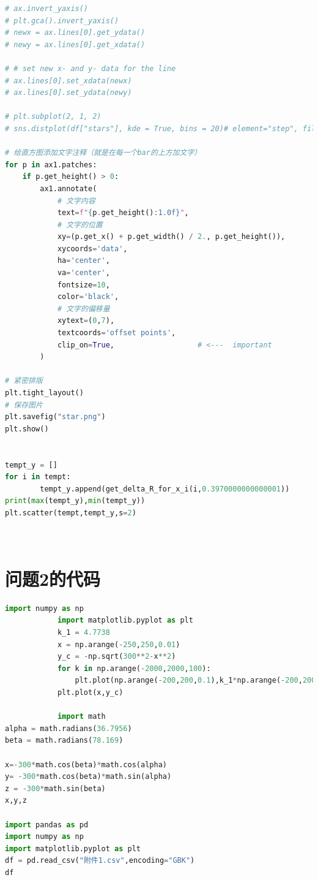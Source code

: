 \documentclass[withoutpreface,bwprint]{cumcmthesis} %
\begin{document}
\begin{appendices}
\begin{lstlisting}[language=python]
# ax.invert_yaxis() 
# plt.gca().invert_yaxis()
# newx = ax.lines[0].get_ydata()
# newy = ax.lines[0].get_xdata()

# # set new x- and y- data for the line
# ax.lines[0].set_xdata(newx)
# ax.lines[0].set_ydata(newy)

# plt.subplot(2, 1, 2)
# sns.distplot(df["stars"], kde = True, bins = 20)# element="step", fill=False)

# 给直方图添加文字注释（就是在每一个bar的上方加文字）
for p in ax1.patches:
    if p.get_height() > 0:
        ax1.annotate(
            # 文字内容
            text=f"{p.get_height():1.0f}",
            # 文字的位置
            xy=(p.get_x() + p.get_width() / 2., p.get_height()), 
            xycoords='data',
            ha='center', 
            va='center', 
            fontsize=10, 
            color='black',
            # 文字的偏移量
            xytext=(0,7), 
            textcoords='offset points',
            clip_on=True,                   # <---  important
        )

# 紧密排版
plt.tight_layout()
# 保存图片
plt.savefig("star.png")
plt.show()


tempt_y = []
for i in tempt:
        tempt_y.append(get_delta_R_for_x_i(i,0.3970000000000001))
print(max(tempt_y),min(tempt_y))
plt.scatter(tempt,tempt_y,s=2)
   



        \end{lstlisting}

        \section{问题2的代码}
        \begin{lstlisting}[language=python]
            import numpy as np
            import matplotlib.pyplot as plt
            k_1 = 4.7738
            x = np.arange(-250,250,0.01)
            y_c = -np.sqrt(300**2-x**2)
            for k in np.arange(-2000,2000,100):
                plt.plot(np.arange(-200,200,0.1),k_1*np.arange(-200,200,0.1))
            plt.plot(x,y_c)

            import math
alpha = math.radians(36.7956)
beta = math.radians(78.169)

x=-300*math.cos(beta)*math.cos(alpha)
y= -300*math.cos(beta)*math.sin(alpha)
z = -300*math.sin(beta)
x,y,z

import pandas as pd 
import numpy as np
import matplotlib.pyplot as plt
df = pd.read_csv("附件1.csv",encoding="GBK")
df


\end{lstlisting}
\end{appendices}
\end{document}
